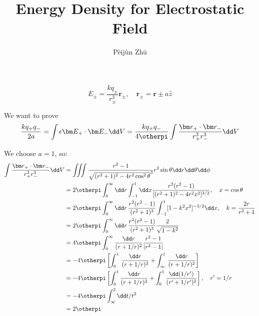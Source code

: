 \documentclass{article}
\title{Energy Density for Electrostatic Field}
\author{P\`eij\`un Zh\=u}
\begin{document}
\maketitle
\[E_\pm=\frac{kq_\pm}{r_\pm^3}\bm r_\pm,\quad \bm r_\pm=\bm r\pm a\hat z\]

We want to prove \[\frac{kq_+q_-}{2a}=\int\epsilon \bm E_+\cdot \bm E_-\dd V=\frac{kq_+q_-}{4\otherpi}\int  \frac{\bm r_+\cdot \bm r_-}{r_+^3r_-^3} \dd V\]

We choose $a=1$, so:
\begin{align}
\int\frac{\bm r_+\cdot \bm r_-}{r_+^3r_-^3}\dd V&=\iiint\frac{r^2-1}{\sqrt{(r^2+1)^2-4r^2\cos^2\theta}^3}r^2\sin\theta \dd r\dd\theta \dd\phi\\
&=2\otherpi\int_0^\infty\dd r\int_{-1}^{1}\dd x \frac{r^2(r^2-1)}{[(r^2+1)^2-4r^2x^2]^{3/2}}, \quad x=\cos\theta\\
&=2\otherpi\int_0^\infty\dd r\,\frac{r^2(r^2-1)}{(r^2+1)^3} \int_{-1}^1[1-k^2x^2]^{-3/2}\dd x, \quad k=\frac{2r}{r^2+1}\\
&=2\otherpi\int_0^\infty\dd r\,\frac{r^2(r^2-1)}{(r^2+1)^3} \frac{2}{\sqrt{1-k^2}}\\
&=4\otherpi\int_0^\infty\frac{\dd r}{(r+1/r)^2} \frac{r^2-1}{|r^2-1|}\\
&=-4\otherpi\left[\int_0^1\,\frac{\dd r}{(r+1/r)^2}+\int_{\infty}^1\,\frac{\dd r}{(r+1/r)^2}\right]\\
&=-4\otherpi\left[\int_0^1\frac{\dd r}{(r+1/r)^2}+\int_0^1\frac{\dd(1/r')}{(r'+1/r')^2}\right],\quad r'=1/r\\
&=-4\otherpi \int_\infty^2 \dd t/t^2\\
&=2\otherpi
\end{align}
\end{document}
